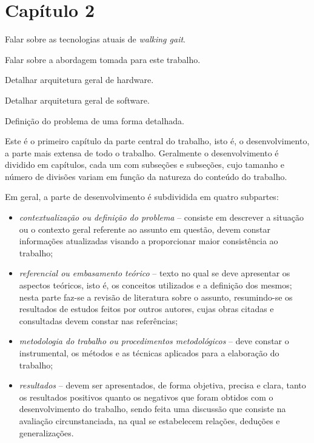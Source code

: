 \chapter{Capítulo 2}


\begin{guide}

	Falar sobre as tecnologias atuais de \textit{walking gait}.
\end{guide}

\begin{guide}
	Falar sobre a abordagem tomada para este trabalho.
\end{guide}

\begin{guide}
	Detalhar arquitetura geral de hardware.
\end{guide}

\begin{guide}
	Detalhar arquitetura geral de software.
\end{guide}

\begin{guide}
	Definição do problema de uma forma detalhada.
\end{guide}


Este é o primeiro capítulo da parte central do trabalho, isto é, o
desenvolvimento, a parte mais extensa de todo o trabalho. Geralmente o
desenvolvimento é dividido em capítulos, cada um com subseções e subseções,
cujo tamanho e número de divisões variam em função da natureza do conteúdo do
trabalho.

Em geral, a parte de desenvolvimento é subdividida em quatro subpartes:

\begin{itemize}
   \item \textit{contextualização ou definição do problema} -- consiste em
   descrever a situação ou o contexto geral referente ao assunto em questão,
   devem constar informações atualizadas visando a proporcionar maior
   consistência ao trabalho;
   \item \textit{referencial ou embasamento teórico} -- texto no qual se deve
   apresentar os aspectos teóricos, isto é, os conceitos utilizados e a
   definição dos mesmos; nesta parte faz-se a revisão de literatura sobre o
   assunto, resumindo-se os resultados de estudos feitos por outros autores,
   cujas obras citadas e consultadas devem constar nas referências;
   \item \textit{metodologia do trabalho ou procedimentos metodológicos} -- deve
   constar o instrumental, os métodos e as técnicas aplicados para a elaboração
   do trabalho;
   \item \textit{resultados} -- devem ser apresentados, de forma objetiva,
   precisa e clara, tanto os resultados positivos quanto os negativos que foram
   obtidos com o desenvolvimento do trabalho, sendo feita uma discussão que
   consiste na avaliação circunstanciada, na qual se estabelecem relações,
   deduções e generalizações.
\end{itemize}

